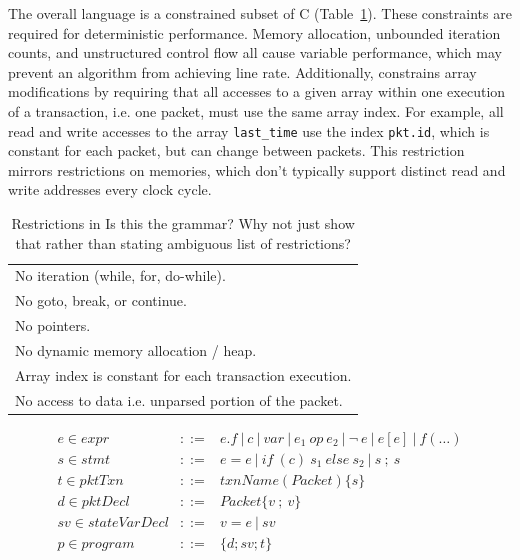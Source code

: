 The overall language is a constrained subset of C (Table~\ref{tab:restrict}).
These constraints are required for deterministic performance.  Memory
allocation, unbounded iteration counts, and unstructured control flow all cause
variable performance, which may prevent an algorithm from achieving line rate.
Additionally, \pktlanguage constrains array modifications by requiring that all
accesses to a given array within one execution of a transaction, i.e. one
packet, must use the same array index. For example, all read and write accesses
to the array \texttt{last\_time} use the index \texttt{pkt.id}, which is
constant for each packet, but can change between packets. This restriction
mirrors restrictions on memories, which don't typically support distinct read
and write addresses every clock cycle.

\begin{table}
  \begin{tabular}{p{}}
    No iteration (while, for, do-while).\\
    No goto, break, or continue.\\
    No pointers.\\
    No dynamic memory allocation / heap.\\
    Array index is constant for each transaction execution.\\
    No access to data i.e. unparsed portion of the packet.\\
  \end{tabular}

\newcommand{\sep}{~|~}
\begin{eqnarray*}
e \in expr &::=& e.f \sep c \sep var \sep e_1~op~e_2 \sep \neg~e \sep e[e] \sep f(\ldots) \\
%
s \in stmt &::=& e = e \sep if~(c)~s_1~else~s_2 \sep s~;~s \\
%
t \in pktTxn &::=& txnName(Packet) \{ s \} \\
%
d \in pktDecl &::=& Packet \{ v~;~v \} \\
%
sv \in stateVarDecl &::=& v = e \sep sv \\
%
p \in program &::=& \{ d ; sv ; t \}
\end{eqnarray*}

  \caption{Restrictions in \pktlanguage \ac{Is this the grammar? Why not just show 
  that rather than stating ambiguous list of restrictions?}}
  \label{tab:restrict}
\end{table}

